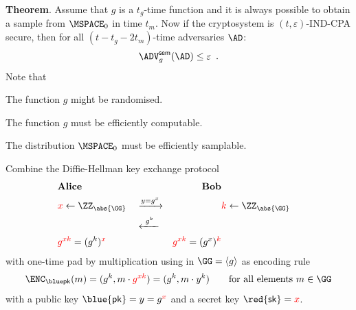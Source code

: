 \documentclass[landscape,footrule]{foils}
\renewcommand{\SK}{{\red{\mathsf{sk}}}}
\renewcommand{\PK}{{\blue{\mathsf{pk}}}}
\begin{document}

\textbf{Theorem}. Assume that $g$ is a $t_g$-time function and it is
always possible to obtain a sample from $\MSPACE_0$ in time
$t_m$. Now if the cryptosystem is $(t,\varepsilon)$-IND-CPA secure,
then for all $(t-t_g-2t_m)$-time adversaries $\AD$:
\begin{align*}
  \advSemXX{g}{\AD}\leq\varepsilon\enspace.
\end{align*}
\vskip 1.5cm
Note that
\begin{triangles}
\item The function $g$ might be randomised.
\item The function $g$ must be efficiently computable.
\item The distribution $\MSPACE_0$ must be efficiently samplable.
\end{triangles}







Combine the Diffie-Hellman key exchange protocol
\begin{align*}
 &\textbf{Alice} && &\textbf{Bob}\\
 & \textcolor{red}{x}\gets\ZZ_{\abs{\GG}}& &\xrightarrow{y=g^x} && \textcolor{red}{k}\gets\ZZ_{\abs{\GG}}\\
 && &\xleftarrow{\ g^k\ }\\
 &\textcolor{red}{g^{xk}}=(g^k)^{\textcolor{red}{x}} && &\textcolor{red}{g^{xk}}=(g^x)^{\textcolor{red}{k}}
\end{align*}
with one-time pad by multiplication using in $\GG=\langle g\rangle$ as
encoding rule
\begin{align*}
  \enc{m}=(g^k,m{}\cdot \textcolor{red}{g^{xk}})=(g^k,m{}\cdot y^k) \qquad 
  \text{for all elements } m\in \GG
\end{align*}
with a public key $\PK=y=g^{\textcolor{red}{x}}$ and a secret key $\SK=\textcolor{red}{x}$.
  


\end{document}
